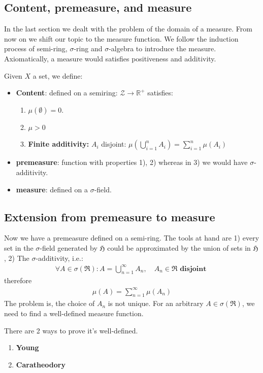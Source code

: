 \subsection{Content, premeasure, and measure}
In the last section we dealt with the problem of the domain of a measure. From now on we shift our topic to the measure function. We follow the induction process of semi-ring, $\sigma$-ring and $\sigma$-algebra to introduce the measure. Axiomatically, a measure would satisfies positiveness and additivity.
\begin{definition}
Given $X$ a set, we define:
	\begin{itemize}
		\item \textbf{Content}: defined on a semiring: $\mathcal{Z} \rightarrow \mathbb{R}^+$ satisfies:
		\begin{enumerate}
			\item $\mu(\emptyset) = 0$. 
			\item $\mu > 0$
			\item \textbf{Finite additivity:} $A_i$ disjoint: $\mu(\bigcup_{i = 1}^n A_i) = \sum_{i = 1}^n \mu(A_i)$
		\end{enumerate}
		\item \textbf{premeasure}: function with properties 1), 2) whereas in 3) we would have $\sigma$-additivity.
		\item \textbf{measure}: defined on a $\sigma$-field.
	\end{itemize}
\end{definition}


\subsection{Extension from premeasure to measure}
Now we have a premeasure defined on a semi-ring. The tools at hand are 1) every set in the $\sigma$-field generated by $\mathfrak{H}$ could be approximated by the union of sets in $\mathfrak{H}$, 2) The $\sigma$-additivity, i.e.:
\begin{align*}
	\forall A \in \sigma(\mathfrak{R}): A = \bigcup_{n =1}^\infty A_n, \quad  A_n \in \mathfrak{R} \textbf{ disjoint }
\end{align*}
therefore
\begin{align*}
	\mu(A) = \sum_{n = 1}^\infty \mu(A_n)
\end{align*}
The problem is, the choice of $A_n$ is not unique. For an arbitrary $A \in \sigma(\mathfrak{R})$, we need to find a well-defined measure function.\par 
There are 2 ways to prove it's well-defined.
\begin{enumerate}
	\item \textbf{Young}
	\item \textbf{Caratheodory}
\end{enumerate} 


